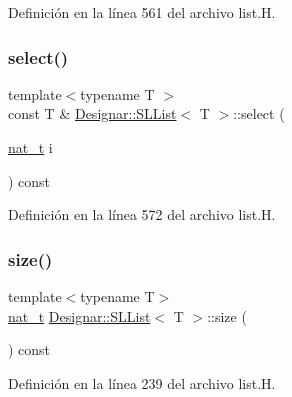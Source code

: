 Definición en la línea 561 del archivo list.\+H.

\mbox{\label{class_designar_1_1_s_l_list_abb09e0413e57c81d7605c79464808ee0}} 
\subsubsection{\texorpdfstring{select()}{select()}\hspace{0.1cm}{\footnotesize\ttfamily [2/2]}}
{\footnotesize\ttfamily template$<$typename T $>$ \\
const T \& \hyperlink{class_designar_1_1_s_l_list}{Designar\+::\+S\+L\+List}$<$ T $>$\+::select (\begin{DoxyParamCaption}\item[{\hyperlink{namespace_designar_aa72662848b9f4815e7bf31a7cf3e33d1}{nat\+\_\+t}}]{i }\end{DoxyParamCaption}) const}



Definición en la línea 572 del archivo list.\+H.

\mbox{\label{class_designar_1_1_s_l_list_a1c98e196a2e6d565efff444a590eaf49}} 
\subsubsection{\texorpdfstring{size()}{size()}}
{\footnotesize\ttfamily template$<$typename T$>$ \\
\hyperlink{namespace_designar_aa72662848b9f4815e7bf31a7cf3e33d1}{nat\+\_\+t} \hyperlink{class_designar_1_1_s_l_list}{Designar\+::\+S\+L\+List}$<$ T $>$\+::size (\begin{DoxyParamCaption}{ }\end{DoxyParamCaption}) const\hspace{0.3cm}{\ttfamily [inline]}}



Definición en la línea 239 del archivo list.\+H.

\mbox{\label{class_designar_1_1_s_l_list_a21c2c6233d40927d715827cf693b4694}} 
